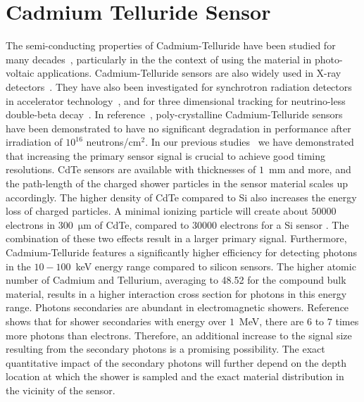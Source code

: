 %
%
%
\section{Cadmium Telluride Sensor}
\label{sec:siliconpad}
The semi-conducting properties of Cadmium-Telluride have been studied for many decades~\cite{cdtegeneric}, 
particularly in the the context of using the material in photo-voltaic applications.
Cadmium-Telluride sensors are also widely used in X-ray detectors~\cite{cdtesensorsgeneric,cdtesensors2,cdtesensors3}. 
They have also been investigated for synchrotron radiation detectors in accelerator 
technology~\cite{cdtelhc}, and for three dimensional tracking for neutrino-less 
double-beta decay~\cite{Filipenko:2014zta}. In reference~\cite{cdtelhc}, poly-crystalline 
Cadmium-Telluride sensors have been demonstrated to have no significant degradation in
performance after irradiation of $10^{16}$ neutrons/$\mathrm{cm}^{2}$. In our previous 
studies~\cite{Anderson:2015gha,MCPShowerMaxPaper,Ronzhin201552,SiliconTiming,PixelatedMCP,Anderson:2016ygg,Anderson:2015tia} 
we have demonstrated that increasing the primary sensor signal is crucial to achieve good timing resolutions.  
CdTe sensors are available with thicknesses of $1$~mm and more, and the path-length of the charged 
shower particles in the sensor material scales up accordingly. The higher density of CdTe compared 
to Si also increases the energy loss of charged particles. 
A minimal ionizing particle will create about $50000$ electrons in 300~$\mathrm{\mu}$m 
of CdTe, compared to $30000$ electrons for a Si sensor \cite{cdtelhc2}.  The combination of these
two effects result in a larger primary signal. Furthermore, Cadmium-Telluride features 
a significantly higher efficiency for detecting photons in the $10-100$~keV energy range 
compared to silicon sensors. The higher atomic number of Cadmium and Tellurium, averaging 
to 48.52 for the compound bulk material, results in a higher interaction cross section for 
photons in this energy range. Photons secondaries are abundant in electromagnetic showers. 
Reference~\cite{Beringer:1900zz} shows that for shower secondaries with energy over 
$1$~MeV, there are $6$ to $7$ times more photons than electrons. Therefore, an 
additional increase to the signal size resulting from the secondary photons is a promising 
possibility. The exact quantitative impact of the secondary photons will further depend 
on the depth location at which the shower is sampled and the exact material distribution 
in the vicinity of the sensor. 

